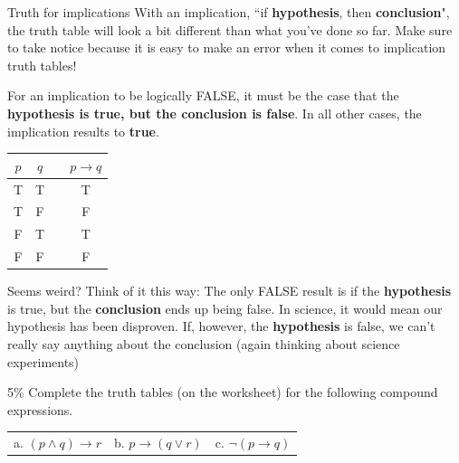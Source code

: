 \documentclass[a4paper,12pt]{book}
\newcounter{question}
\begin{document}
        \newpage
        \begin{intro}{Truth for implications}
            With an implication, ``if \textbf{hypothesis}, then \textbf{conclusion}",
            the truth table will look a bit different than what you've done so far.
            Make sure to take notice because it is easy to make an error when it
            comes to implication truth tables!

            For an implication to be logically FALSE, it must be the case that
            the \textbf{hypothesis is true, but the conclusion is false}. In
            all other cases, the implication results to \textbf{true}.

            \begin{center}
                \begin{tabular}{| c | c | c | c |}
                    \hline{}
                    $p$ & $q$ & & $p \to q$
                    \\ \hline
                    T & T & & T
                    \\ \hline

                    T & F & & F
                    \\ \hline

                    F & T & & T
                    \\ \hline

                    F & F & & F
                    \\ \hline
                \end{tabular}
            \end{center}

            Seems weird? Think of it this way: The only FALSE result is if
            the \textbf{hypothesis} is true, but the \textbf{conclusion}
            ends up being false. In science, it would mean our hypothesis
            has been disproven. If, however, the \textbf{hypothesis}
            is false, we can't really say anything about the conclusion
            (again thinking about science experiments)
        \end{intro}

        \begin{question}{\thequestion}{5\%}
            Complete the truth tables (on the worksheet) for the following
            compound expressions.

            \begin{center}
                \begin{tabular}{p{4cm} p{4cm} p{4cm}}
                    a. $(p \land q) \to r$ &
                    b. $p \to (q \lor r)$ &
                    c. $\neg( p \to q )$
                \end{tabular}
            \end{center}
        \end{question}
\end{document}
